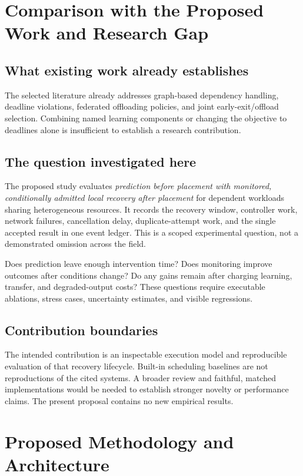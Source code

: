 \documentclass[11pt,a4paper]{article}
\begin{document}
\section{Comparison with the Proposed Work and Research Gap}
\subsection{What existing work already establishes}
The selected literature already addresses graph-based dependency handling,
deadline violations, federated offloading policies, and joint early-exit/offload
selection\cite{chen2026,kaur2025,angelucci2026}. Combining named learning
components or changing the objective to deadlines alone is insufficient to
establish a research contribution.

\subsection{The question investigated here}
The proposed study evaluates \emph{prediction before placement with monitored,
conditionally admitted local recovery after placement} for dependent workloads
sharing heterogeneous resources. It records the recovery window, controller
work, network failures, cancellation delay, duplicate-attempt work, and the
single accepted result in one event ledger. This is a scoped experimental
question, not a demonstrated omission across the field.

Does prediction leave enough intervention time? Does monitoring improve
outcomes after conditions change? Do any gains remain after charging learning,
transfer, and degraded-output costs? These questions require executable
ablations, stress cases, uncertainty estimates, and visible regressions.

\subsection{Contribution boundaries}
The intended contribution is an inspectable execution model and reproducible
evaluation of that recovery lifecycle. Built-in scheduling baselines are not
reproductions of the cited systems. A broader review and faithful, matched
implementations would be needed to establish stronger novelty or performance
claims. The present proposal contains no new empirical results.

\section{Proposed Methodology and Architecture}
\end{document}
